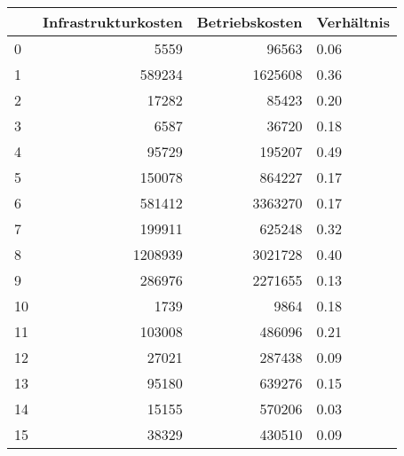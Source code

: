 \begin{tabular}{lrrl}
\toprule
{} &  Infrastrukturkosten &  Betriebskosten & Verhältnis \\
\midrule
0  &                 5559 &           96563 &       0.06 \\
1  &               589234 &         1625608 &       0.36 \\
2  &                17282 &           85423 &       0.20 \\
3  &                 6587 &           36720 &       0.18 \\
4  &                95729 &          195207 &       0.49 \\
5  &               150078 &          864227 &       0.17 \\
6  &               581412 &         3363270 &       0.17 \\
7  &               199911 &          625248 &       0.32 \\
8  &              1208939 &         3021728 &       0.40 \\
9  &               286976 &         2271655 &       0.13 \\
10 &                 1739 &            9864 &       0.18 \\
11 &               103008 &          486096 &       0.21 \\
12 &                27021 &          287438 &       0.09 \\
13 &                95180 &          639276 &       0.15 \\
14 &                15155 &          570206 &       0.03 \\
15 &                38329 &          430510 &       0.09 \\
\bottomrule
\end{tabular}
